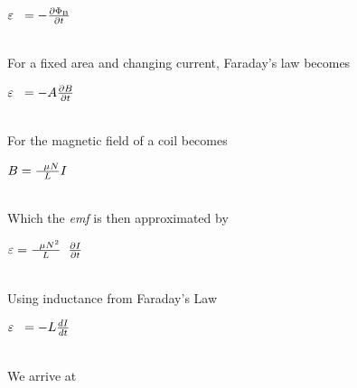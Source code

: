 \documentclass[12pt]{article}
\begin{document}
\begin{center}
	\begin{LARGE}
	${\varepsilon} \hspace{2mm }= -{{\partial\Phi_\text{B}} \over \partial t}$	\end{LARGE}\\
	\vspace{5mm}
	For a fixed area and changing current, Faraday's law becomes\\
	\vspace{5mm}
	\begin{LARGE}
		${\varepsilon} \hspace{2mm }= -A{{\partial B} \over \partial t}$
	\end{LARGE}\\
	\vspace{5mm}
	For the magnetic field of a coil becomes\\
	\vspace{5mm}
	\begin{LARGE}
		${B} = {\hspace{2mm } \mu{N} \over L} I$
	\end{LARGE}\\
	\vspace{5mm}
	Which the \textit{emf} is then approximated by\\
	\vspace{5mm}
	\begin{LARGE}
		${\varepsilon} = {\hspace{2mm } \mu{N^2} \over L} \hspace{2mm}{{\partial I} \over \partial t}$
	\end{LARGE}\\
	\vspace{5mm}
	Using inductance from Faraday's Law\\
	\vspace{5mm}
	\begin{LARGE}
		${\varepsilon} \hspace{2mm }= -L{{dI} \over dt}$
	\end{LARGE}\\
	\vspace{5mm}
We arrive at\\
\vspace{5mm}
\begin{center}
	\begin{LARGE}
		\end {LARGE}
	\end{center}
\end{center} 
\end{document}
